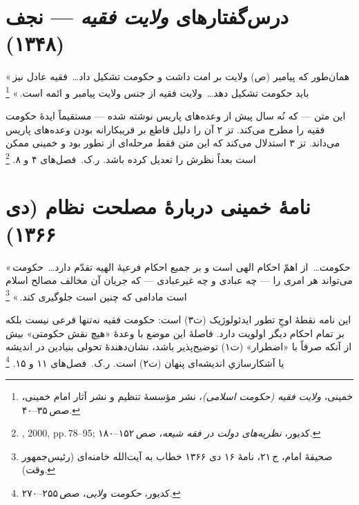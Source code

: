 \documentclass[12pt,a4paper]{book}
\newcommand{\en}[1]{\lr{\textit{#1}}}
\begin{document}
\section{درس‌گفتارهای \textit{ولایت فقیه} — نجف (۱۳۴۸)}
\label{sec:app-b-velayat}

\begin{warningBox}
«\,همان‌طور که پیامبر (ص) ولایت بر امت داشت
و حکومت تشکیل داد\dots\
فقیه عادل نیز باید حکومت تشکیل دهد\dots\
ولایت فقیه از جنس ولایت پیامبر و ائمه است.\,»%
\footnote{خمینی، \textit{ولایت فقیه (حکومت اسلامی)}،
نشر مؤسسهٔ تنظیم و نشر آثار امام خمینی، صص\,۳۵–۴۰.}
\end{warningBox}

\begin{noteBox}
این متن — که نُه سال پیش از وعده‌های پاریس نوشته شده —
مستقیماً ایدهٔ حکومت فقیه را مطرح می‌کند.
تز ۲ آن را دلیل قاطع بر فریبکارانه بودن وعده‌های پاریس می‌داند.
تز ۳ استدلال می‌کند که این متن فقط مرحله‌ای از تطور بود
و خمینی ممکن است بعداً نظرش را تعدیل کرده باشد.
ر.ک.\ فصل‌های ۴ و ۸.%
\footnote{\en{Martin}, 2000, pp.\,78–95;
کدیور، \textit{نظریه‌های دولت در فقه شیعه}، صص\,۱۵۲–۱۸۰.}
\end{noteBox}

\section{نامهٔ خمینی دربارهٔ مصلحت نظام (دی ۱۳۶۶)}
\label{sec:app-b-maslahat}

\begin{warningBox}
«\,حکومت\dots\ از اهمّ احکام الهی است
و بر جمیع احکام فرعیهٔ الهیه تقدّم دارد\dots\
حکومت می‌تواند هر امری را — چه عبادی و چه غیرعبادی —
که جریان آن مخالف مصالح اسلام است
مادامی که چنین است جلوگیری کند.\,»%
\footnote{صحیفهٔ امام، ج\,۲۱، نامهٔ ۱۶ دی ۱۳۶۶
خطاب به آیت‌الله خامنه‌ای (رئیس‌جمهور وقت).}
\end{warningBox}

\begin{noteBox}
این نامه نقطهٔ اوجِ تطور ایدئولوژیک (ت‌۳) است:
حکومت فقیه نه‌تنها فرعی نیست
بلکه بر تمام احکام دیگر اولویت دارد.
فاصلهٔ این موضع با وعدهٔ «هیچ نقش حکومتی»
بیش از آنکه صرفاً با «اضطرار» (ت‌۱) توضیح‌پذیر باشد،
نشان‌دهندهٔ تحولی بنیادین در اندیشه یا
آشکارسازیِ اندیشه‌ای پنهان (ت‌۲) است.
ر.ک.\ فصل‌های ۱۱ و ۱۵.%
\footnote{کدیور، \textit{حکومت ولایی}، صص\,۲۵۵–۲۷۰.}
\end{noteBox}
\end{document}
